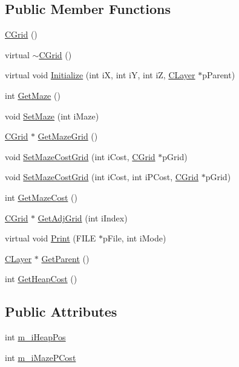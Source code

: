 \subsection*{Public Member Functions}
\begin{DoxyCompactItemize}
\item 
\mbox{\hyperlink{classCGrid_a061e223431ef4fb00b020539f34d1289}{C\+Grid}} ()
\item 
virtual \mbox{\hyperlink{classCGrid_a80640e70ebece5aab78c8445d7aef7a4}{$\sim$\+C\+Grid}} ()
\item 
virtual void \mbox{\hyperlink{classCGrid_ac56d94ad7df38d3908ff3b12670d9812}{Initialize}} (int iX, int iY, int iZ, \mbox{\hyperlink{classCLayer}{C\+Layer}} $\ast$p\+Parent)
\item 
int \mbox{\hyperlink{classCGrid_a773d780808e0bd62f3f5867ca4fe102f}{Get\+Maze}} ()
\item 
void \mbox{\hyperlink{classCGrid_ab8f8f688a787fb740321dd53bdcb3f00}{Set\+Maze}} (int i\+Maze)
\item 
\mbox{\hyperlink{classCGrid}{C\+Grid}} $\ast$ \mbox{\hyperlink{classCGrid_a49c151fb13b2fa36acb3530a8d477893}{Get\+Maze\+Grid}} ()
\item 
void \mbox{\hyperlink{classCGrid_aec202544655ecef4303ab81e2d386e27}{Set\+Maze\+Cost\+Grid}} (int i\+Cost, \mbox{\hyperlink{classCGrid}{C\+Grid}} $\ast$p\+Grid)
\item 
void \mbox{\hyperlink{classCGrid_aad3dff7adb72d18a6038718c1f02993a}{Set\+Maze\+Cost\+Grid}} (int i\+Cost, int i\+P\+Cost, \mbox{\hyperlink{classCGrid}{C\+Grid}} $\ast$p\+Grid)
\item 
int \mbox{\hyperlink{classCGrid_aba82d88e217d71278fce3d7ed35a9b03}{Get\+Maze\+Cost}} ()
\item 
\mbox{\hyperlink{classCGrid}{C\+Grid}} $\ast$ \mbox{\hyperlink{classCGrid_a01a71c7e09d8dee33ef570b40120c3d3}{Get\+Adj\+Grid}} (int i\+Index)
\item 
virtual void \mbox{\hyperlink{classCGrid_a6462a8c5f7d7b6cbba02bac1d82dcbba}{Print}} (F\+I\+LE $\ast$p\+File, int i\+Mode)
\item 
\mbox{\hyperlink{classCLayer}{C\+Layer}} $\ast$ \mbox{\hyperlink{classCGrid_af44b06db6a18bd3ae28cc4cfecfeb396}{Get\+Parent}} ()
\item 
int \mbox{\hyperlink{classCGrid_a8cc04f0ad9e054d50ad79e1acd398509}{Get\+Heap\+Cost}} ()
\end{DoxyCompactItemize}
\subsection*{Public Attributes}
\begin{DoxyCompactItemize}
\item 
int \mbox{\hyperlink{classCGrid_a57166c24c1b0525e425a747636831c79}{m\+\_\+i\+Heap\+Pos}}
\item 
int \mbox{\hyperlink{classCGrid_a1bf1fef7c4ac3f2b3b63bf3c70e0b876}{m\+\_\+i\+Maze\+P\+Cost}}
\end{DoxyCompactItemize}
